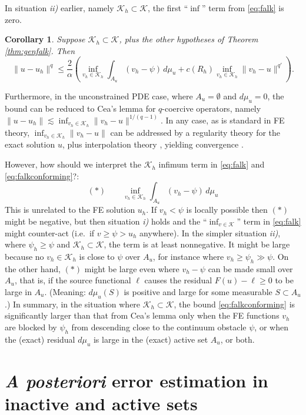 \documentclass[]{interact}
\theoremstyle{plain}%
\newtheorem{corollary}[theorem]{Corollary}
\theoremstyle{definition}
\theoremstyle{remark}
\newcommand{\cK}{\mathcal{K}}
\begin{document}
In situation \emph{ii)} earlier, namely $\cK_h\subset \cK$, the first ``$\inf$'' term from \eqref{eq:falk} is zero.

\begin{corollary} \label{cor:falkconforming}
Suppose $\cK_h\subset \cK$, plus the other hypotheses of Theorem \ref{thm:genfalk}.  Then
\begin{equation} \label{eq:falkconforming}
\|u-u_h\|^q \le \frac{2}{\alpha} \left(\inf_{v_h\in\cK_h} \int_{A_u} (v_h-\psi)\,d\mu_u + c(R_h) \inf_{v_h\in\cK_h} \|v_h - u\|^{q'}\right).
\end{equation}
\end{corollary}

Furthermore, in the unconstrained PDE case, where $A_u=\emptyset$ and $d\mu_u=0$, the bound can be reduced to Cea's lemma for $q$-coercive operators, namely $\|u-u_h\| \lesssim \inf_{v_h\in\cK_h} \|v_h - u\|^{1/(q-1)}$.  In any case, as is standard in FE theory, $\inf_{v_h\in\cK_h} \|v_h - u\|$ can be addressed by a regularity theory for the exact solution $u$, plus interpolation theory \cite{AinsworthOden2000,ElmanSilvesterWathen2014}, yielding convergence \cite[Theorem 5.1.2]{Ciarlet2002}.

However, how should we interpret the $\cK_h$ infimum term in \eqref{eq:falk} and \eqref{eq:falkconforming}?:
	$$(\ast) \qquad \inf_{v_h\in\cK_h} \int_{A_u} (v_h-\psi)\,d\mu_u$$
This is unrelated to the FE solution $u_h$.  If $v_h < \psi$ is locally possible then $(\ast)$ might be negative, but then situation \emph{i)} holds and the ``$\inf_{v\in\cK}$'' term in \eqref{eq:falk} might counter-act (i.e.~if $v\ge \psi > u_h$ anywhere).  In the simpler situation \emph{ii)}, where $\psi_h\ge \psi$ and $\cK_h\subset \cK$, the term is at least nonnegative.  It might be large because no $v_h\in\cK_h$ is close to $\psi$ over $A_u$, for instance where $v_h\ge \psi_h \gg \psi$.  On the other hand, $(\ast)$ might be large even where $v_h-\psi$ can be made small over $A_u$, that is, if the source functional $\ell$ causes the residual $F(u)-\ell\ge 0$ to be large in $A_u$.  (Meaning: $d\mu_u(S)$ is positive and large for some measurable $S\subset A_u$.)  In summary, in the situation where $\cK_h\subset \cK$, the bound \eqref{eq:falkconforming} is significantly larger than that from Cea's lemma only when the FE functions $v_h$ are blocked by $\psi_h$ from descending close to the continuum obstacle $\psi$, or when the (exact) residual $d\mu_u$ is large in the (exact) active set $A_u$, or both.


\section{\emph{A posteriori} error estimation in inactive and active sets} \label{sec:aposteriori}
\end{document}
